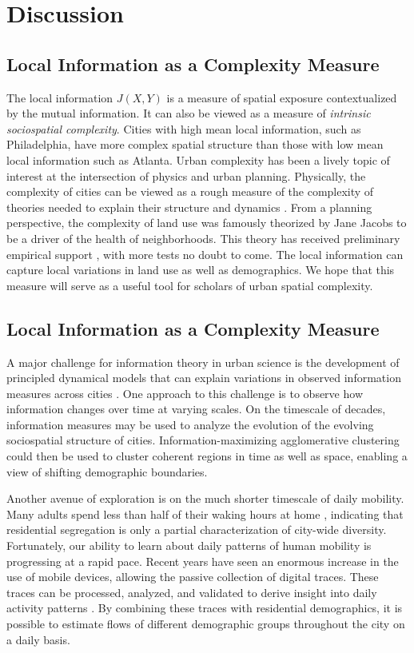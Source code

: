 \documentclass[9pt,twocolumn,twoside]{pnas-new}
\begin{document}
\section*{Discussion}
	
	\subsection*{Local Information as a Complexity Measure}
		The local information $J(X,Y)$ is a measure of spatial exposure contextualized by the mutual information. It can also be viewed as a measure of \emph{intrinsic sociospatial complexity}. Cities with high mean local information, such as Philadelphia, have more complex spatial structure than those with low mean local information such as Atlanta. Urban complexity has been a lively topic of interest at the intersection of physics and urban planning. Physically, the complexity of cities can be viewed as a rough measure of the complexity of theories needed to explain their structure and dynamics \cite{Bettencourt2015}. From a planning perspective, the complexity of land use was famously theorized by Jane Jacobs \cite{Jacobs1992} to be a driver of the health of neighborhoods. This theory has received preliminary empirical support \cite{DeNadai2016a}, with more tests no doubt to come. The local information can capture local variations in land use as well as demographics. We hope that this measure will serve as a useful tool for scholars of urban spatial complexity.  
	\subsection*{Local Information as a Complexity Measure}
		A major challenge for information theory in urban science is the development of principled dynamical models that can explain variations in observed information measures across cities \cite{Batty2014a}. One approach to this challenge is to observe how information changes over time at varying scales. On the timescale of decades, information measures may be used to analyze the evolution of the evolving sociospatial structure of cities. Information-maximizing agglomerative clustering could then be used to cluster coherent regions in time as well as space, enabling a view of shifting demographic boundaries.

		Another avenue of exploration is on the much shorter timescale of daily mobility. Many adults spend less than half of their waking hours at home \cite{BureauofLaborStati2014}, indicating that residential segregation is only a partial characterization of city-wide diversity. Fortunately, our ability to learn about daily patterns of human mobility is progressing at a rapid pace. Recent years have seen an enormous increase in the use of mobile devices, allowing the passive collection of digital traces. These traces can be processed, analyzed, and validated to derive insight into daily activity patterns \cite{Widhalm2015,Yang,Jiang2013,Jiang2012c}. By combining these traces with residential demographics, it is possible to estimate flows of different demographic groups throughout the city on a daily basis. 
\end{document}
